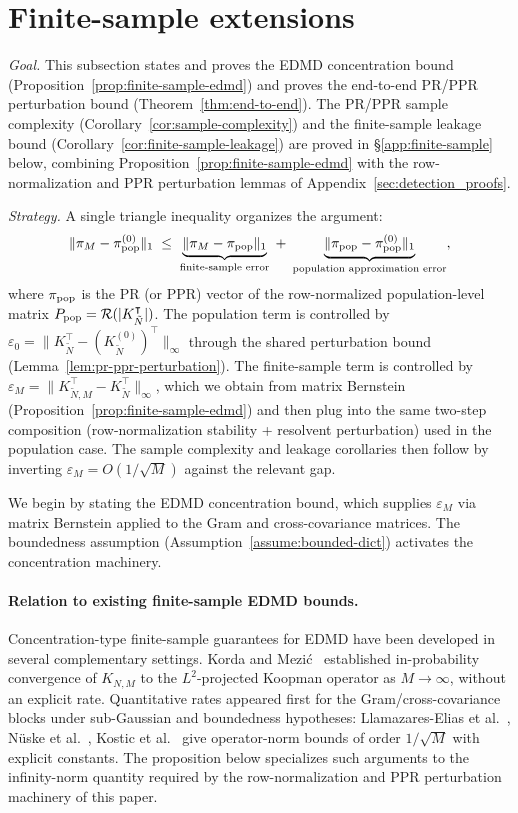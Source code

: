 \documentclass{article}
\theoremstyle{plain}
\theoremstyle{definition}
\def\tp{\intercal}
\newcommand{\arXivtag}[1][]{#1}
\begin{document}
\section{Finite-sample extensions}\label{sec:proofs-finite}

\emph{Goal.} This subsection states and proves the EDMD concentration bound (Proposition~\ref{prop:finite-sample-edmd}) and proves the end-to-end PR/PPR perturbation bound (Theorem~\ref{thm:end-to-end}). The PR/PPR sample complexity (Corollary~\ref{cor:sample-complexity}) and the finite-sample leakage bound (Corollary~\ref{cor:finite-sample-leakage}) are proved in \S\ref{app:finite-sample} below, combining Proposition~\ref{prop:finite-sample-edmd} with the row-normalization and PPR perturbation lemmas of Appendix~\ref{sec:detection_proofs}.

\emph{Strategy.} A single triangle inequality organizes the argument:
\[
\|{\pi}_M - \pi_{\textnormal{pop}}^{(0)}\|_1 \;\leq\; \underbrace{\|{\pi}_M - \pi_{\textnormal{pop}}\|_1}_{\text{finite-sample error}} \;+\; \underbrace{\|\pi_{\textnormal{pop}} - \pi_{\textnormal{pop}}^{(0)}\|_1}_{\text{population approximation error}},
\]
where $\pi_{\textnormal{pop}}$ is the PR (or PPR) vector of the row-normalized \arXivtag[population-level matrix $P_{\textnormal{pop}} = \mathcal{R}(|K_{\tilde{N}}^\tp|)$].
The population term is controlled by $\varepsilon_0 = \|K_{\tilde{N}}^\tp - (K_{\tilde{N}}^{(0)})^\tp\|_\infty$ through the shared perturbation bound (Lemma~\ref{lem:pr-ppr-perturbation}). The finite-sample term is controlled by $\varepsilon_M = \|K_{\tilde{N},M}^\tp - K_{\tilde{N}}^\tp\|_\infty$, which we obtain from matrix Bernstein (Proposition~\ref{prop:finite-sample-edmd}) and then plug into the same two-step composition (row-normalization stability + resolvent perturbation) used in the population case. The sample complexity and leakage corollaries then follow by inverting $\varepsilon_M = O(1/\sqrt{M})$ against the relevant gap.

We begin by stating the EDMD concentration bound, which supplies $\varepsilon_M$ via matrix Bernstein applied to the Gram and cross-covariance matrices. The boundedness assumption (Assumption~\ref{assume:bounded-dict}) activates the concentration machinery.

\paragraph{Relation to existing finite-sample EDMD bounds.}
Concentration-type finite-sample guarantees for EDMD have been developed in several complementary settings. Korda and Mezi\'c~\cite{korda2018convergence} established in-probability convergence of $K_{N,M}$ to the $L^2$-projected Koopman operator as $M\to\infty$, without an explicit rate. Quantitative rates appeared first for the Gram/cross-covariance blocks under sub-Gaussian and boundedness hypotheses: Llamazares-Elias et al.~\cite{elias2024datadriven},  N\"uske et al.~\cite{nuske2023finite}, Kostic et al.~\cite{Kostic-NeuRips2023} give operator-norm bounds of order $\arXivtag[1/\sqrt{M}]$ with explicit constants.  
The proposition below specializes such arguments to the infinity-norm quantity required by the row-normalization and PPR perturbation machinery of this paper.
\end{document}
